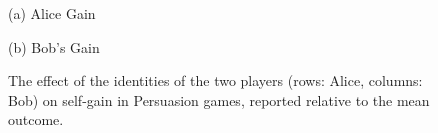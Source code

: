 \begin{figure}[ht]

\vspace{1ex}
\begin{minipage}[t]{0.48\textwidth}
    \centering
    \hspace{9em} (a) Alice Gain \par\vspace{1ex}
    
\end{minipage}
\hfill
\begin{minipage}[t]{0.48\textwidth}
    \centering
    (b) Bob's Gain \par\vspace{1ex}
    
\end{minipage}
\caption{\centering
The effect of the identities of the two players (rows: Alice, columns: Bob) on self-gain in Persuasion games, reported relative to the mean outcome.}
\label{table:persuasion_self_gain}
\end{figure}


